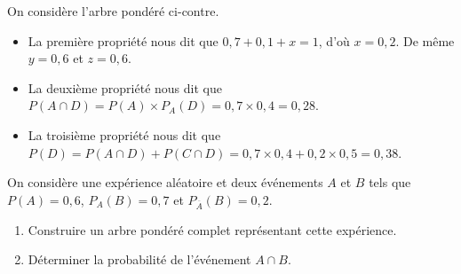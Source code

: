 \documentclass[11pt]{article}
\begin{document}
\begin{exemple}
  \begin{minipage}{.6\textwidth}
    On considère l'arbre pondéré ci-contre.
    \begin{itemize}
      \item La première propriété nous dit que $0,7+0,1+x=1$, d'où $x=0,2$. De
        même $y=0,6$ et $z=0,6$.
      \item La deuxième propriété nous dit que $P(A\cap D)=P(A)\times
        P_A(D)=0,7\times0,4=0,28$.
      \item La troisième propriété nous dit que $P(D)=P(A\cap D)+P(C\cap
        D)=0,7\times0,4+0,2\times0,5=0,38$.
    \end{itemize}
  \end{minipage}
    \begin{minipage}{.4\textwidth}
    \begin{center}
\end{center}    
  \end{minipage}
\end{exemple}
\begin{app}
  On considère une expérience aléatoire et deux événements $A$ et $B$ tels que
  $P(A)=0,6$, $P_A(B)=0,7$ et $P_{\overline A}(B)=0,2$.
  \begin{enumerate}
    \item Construire un arbre pondéré complet représentant cette expérience.
    \item Déterminer la probabilité de l'événement $A\cap B$.
  \end{enumerate}
\end{app}
\end{document}
